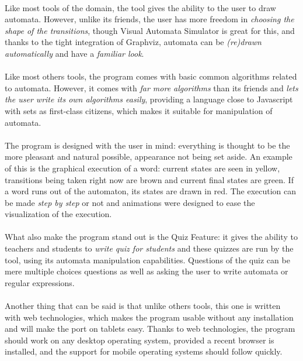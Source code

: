 \documentclass{article}
\begin{document}
\begin{sloppypar}
\paragraph{}
Like most tools of the domain, the tool gives the ability to the user to draw automata. However, unlike its friends, the user has more freedom in {\em choosing the shape of the transitions}, though Visual Automata Simulator is great for this, and thanks to the tight integration of Graphviz, automata can be {\em (re)drawn automatically} and have a {\em familiar look}.
   
   
\paragraph{}
Like most others tools, the program comes with basic common algorithms related to automata. However, it comes with {\em far more algorithms} than its friends and {\em lets the user write its own algorithms easily}, providing a language close to Javascript with sets as first-class citizens, which makes it suitable for manipulation of automata.

   
\paragraph{}
The program is designed with the user in mind: everything is thought to be the more pleasant and natural possible, appearance not being set aside. An example of this is the graphical execution of a word: current states are seen in yellow, transitions being taken right now are brown and current final states are green. If a word runs out of the automaton, its states are drawn in red. The execution can be made {\em step by step} or not and animations were designed to ease the visualization of the execution.

   
\paragraph{}
What also make the program stand out is the Quiz Feature: it gives the ability to teachers and students to {\em write quiz for students} and these quizzes are run by the tool, using its automata manipulation capabilities. Questions of the quiz can be mere multiple choices questions as well as asking the user to write automata or regular expressions.
   
   
\paragraph{}
Another thing that can be said is that unlike others tools, this one is written with web technologies, which makes the program usable without any installation and will make the port on tablets easy. Thanks to web technologies, the program should work on any desktop operating system, provided a recent browser is installed, and the support for mobile operating systems should follow quickly.



\end{sloppypar}
\end{document}
